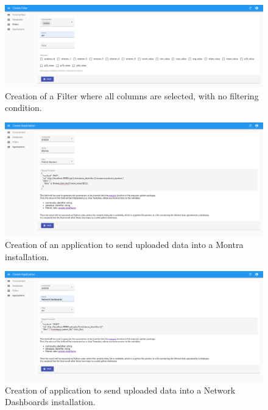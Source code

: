\documentclass[11pt,a4paper,openright,twoside,onecolumn]{memoir}
\begin{document}
\begin{figure}[H]
    \center
    \includegraphics[width=\textwidth]{figs/admin-portal/filter-creation-all}
    \caption{Creation of a Filter where all columns are selected, with no filtering condition.}
    \label{fig:admin-portal/filter-creation-all}
\end{figure}

\begin{figure}[H]
    \center
    \includegraphics[width=\textwidth]{figs/admin-portal/application-creation-montra}
    \caption{Creation of an application to send uploaded data into a Montra installation.}
    \label{fig:admin-portal/application-creation-montra}
\end{figure}

\begin{figure}[H]
    \center
    \includegraphics[width=\textwidth]{figs/admin-portal/application-creation-dashboards}
    \caption{Creation of application to send uploaded data into a Network Dashboards installation.}
    \label{fig:admin-portal/application-creation-dashboards}
\end{figure}
\end{document}
